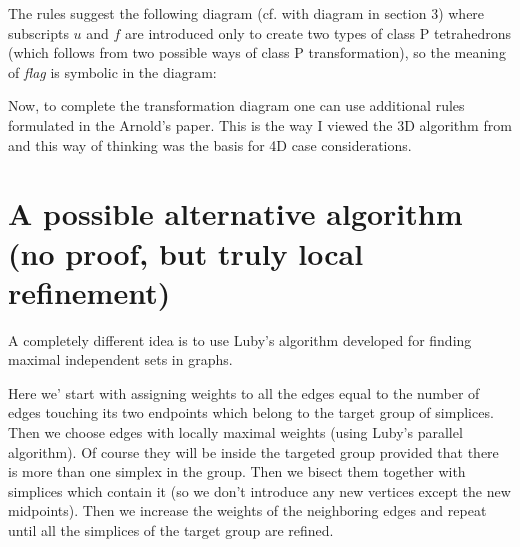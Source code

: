 \documentclass[a4paper,12pt]{amsart}
\numberwithin{equation}{section}
\begin{document}
The rules suggest the following diagram (cf. with diagram in section 3) where subscripts $u$ and $f$ are introduced only to create two types of class P tetrahedrons (which follows from two possible ways of class P transformation), so the meaning of \textit{flag} is symbolic in the diagram:

\begin{center}
\end{center}

Now, to complete the transformation diagram one can use additional rules formulated in the Arnold's paper. This is the way I viewed the 3D algorithm from \cite{arnold} and this way of thinking was the basis for 4D case considerations.

\section{A possible alternative algorithm (no proof, but truly local refinement)}
A completely different idea is to use Luby's algorithm developed for finding maximal independent sets in graphs. 

Here we' start with assigning weights to all the edges equal to the number of edges touching its two endpoints which belong to the target group of simplices.
Then we choose edges with locally maximal weights (using Luby's parallel algorithm). Of course they will be inside the targeted group provided that there is more than one simplex in the group. Then we bisect them together with simplices which contain it (so we don't introduce any new vertices except the new midpoints).
Then we increase the weights of the neighboring edges and repeat until all the simplices of the target group are refined.
\end{document}
